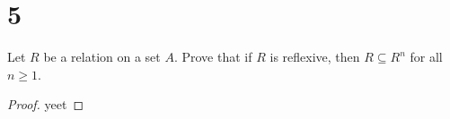 \documentclass[11pt]{scrartcl}
\begin{document}
\section{5}
Let $R$ be a relation on a set $A$. Prove that if $R$ is reflexive, then $R \subseteq R^n$
for all $n \geq 1$.
\begin{proof}
	yeet
	
\end{proof}

\begin{comment}

Prove that in any group of $n$ people $(n \geq 2),$ there must be two people with the same number of friends within the group. Assume friendship
is mutual, and nobody is their own friend. 
\begin{proof}
	Given that there is $n$ people, the amount of friends each person will be in this set: $\{0,1,\cdots, n-1\}$, excluding $n$
	because you cannot be friends with yourself. Consider the case when someone has $n-1$ friends. This means everyone in this group
	has at least one friend. Also consider the case when someone has $0$ friends. This means that the most amount of friends one can
	have is $n-2$ because you cannot be friends with yourself and with the person with $0$ friends. Thus the range of friends that 
	a group has is actually $\{1,2,\cdots, n-1\}$ or $\{0,1,\cdots, n-2\}$. In both cases, the number possible combination of friends 
	one can have is $n-1$. Using the pigeonhole principle, it directly follows that there must exist at least 2 people with the same 
	number of friends in this group. 
\end{proof}
\begin{enumerate}[label=\alph*.]
	\item{
	      Let $T$ be a tree. Prove that if you remove a leaf $l$ and the only edge incident with $l$ from $T$,
	      the resulting subgraph $T^{\prime}$ is still a tree.
	      \begin{proof}
		      Since $T$ is a tree, it is by definition acyclic and connected. We must show that $T'$
		      holds the property of a	tree.
		      \begin{enumerate}[label=\roman*.]
			      \item{
			            $T'$ is connected \par
			            From lecture, we know that a graph is connected if and only if there is a simple path between
			            every two distinct vertices. If we removed a leaf and only its edge incident, we know that
			            this cannot affect any simple path from $\{u,v\}$ in the tree. Thus, the resulting tree, $T'$,

\end{comment}
\end{document}
